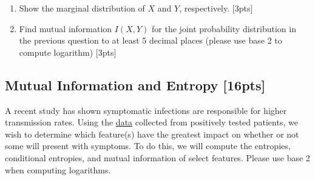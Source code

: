 \documentclass{article}
\begin{document}
\begin{enumerate}[label=(\alph*)]
    \item Show the marginal distribution of $X$ and $Y$, respectively. [3pts]
    \item Find mutual information $I(X,Y)$ for the joint probability distribution in the previous question to at least 5 decimal places (please use base 2 to compute logarithm) [3pts]
\end{enumerate}

\newpage

\subsection{Mutual Information and Entropy [16pts]}
A recent study has shown symptomatic infections are responsible for higher transmission rates. Using the \href{https://docs.google.com/spreadsheets/d/1KYade9n4Gh34GMgdJAQt3qHVxFx48jqAXX4kNu4XrZQ/edit?usp=sharing}{data} collected from positively tested patients, we wish to determine which feature(s) have the greatest impact on whether or not some will present with symptoms. To do this, we will compute the entropies, conditional entropies, and mutual information of select features. Please use base 2 when computing logarithms.
\end{document}

